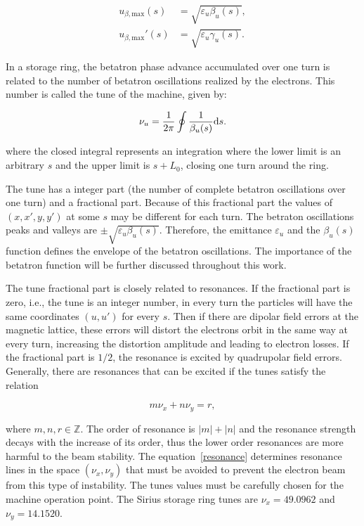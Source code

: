 \begin{align}
    u_{\beta, \mathrm{max}}(s) &= \sqrt{\varepsilon_u \beta_u(s)}, \\
    {u}_{\beta, \mathrm{max}}'(s) &= \sqrt{\varepsilon_u \gamma_u(s)}.
\end{align}

In a storage ring, the betatron phase advance accumulated over one turn is related to the number of betatron oscillations realized by the electrons. This number is called the tune of the machine, given by:

\begin{equation}
    \nu_u = \dfrac{1}{2\pi} \oint \dfrac{1}{\beta_u({s})} \mathrm{d} {s}.
\end{equation}

where the closed integral represents an integration where the lower limit is an arbitrary $s$ and the upper limit is $s + L_0$, closing one turn around the ring.

The tune has a integer part (the number of complete betatron oscillations over one turn) and a fractional part. Because of this fractional part the values of $(x, x', y, y')$ at some $s$ may be different for each turn. The betraton oscillations peaks and valleys are $\pm \sqrt{\varepsilon_u \beta_u(s)}$. Therefore, the emittance $\varepsilon_u$ and the $\beta_u(s)$ function defines the envelope of the betatron oscillations. The importance of the betatron function will be further discussed throughout this work.

The tune fractional part is closely related to resonances. If the fractional part is zero, i.e., the tune is an integer number, in every turn the particles will have the same coordinates $(u, u')$ for every $s$. Then if there are dipolar field errors at the magnetic lattice, these errors will distort the electrons orbit in the same way at every turn, increasing the distortion amplitude and leading to electron losses. If the fractional part is $1/2$, the resonance is excited by quadrupolar field errors. Generally, there are resonances that can be excited if the tunes satisfy the relation

\begin{equation}
    m \nu_x + n \nu_y = r,
    \label{resonance}
\end{equation}

where $m, n, r \in \mathbb{Z}$. The order of resonance is $|m| + |n|$ and the resonance strength decays with the increase of its order, thus the lower order resonances are more harmful to the beam stability. The equation~\eqref{resonance} determines resonance lines in the space $(\nu_x, \nu_y)$ that must be avoided to prevent the electron beam from this type of instability. The tunes values must be carefully chosen for the machine operation point. The Sirius storage ring tunes are $\nu_x = 49.0962$ and $\nu_y=14.1520$.


